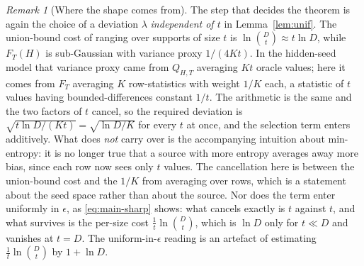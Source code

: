 \documentclass[11pt,a4paper]{article}
\theoremstyle{plain}
\theoremstyle{definition}
\theoremstyle{remark}
\newtheorem{remark}{Remark}
\begin{document}
\begin{remark}[Where the shape comes from]\label{rem:shape}
The step that decides the theorem is again the choice of a deviation $\lambda$ \emph{independent of
$t$} in Lemma~\ref{lem:unif}. The union-bound cost of ranging over supports of size $t$ is
$\ln\binom{D}{t} \approx t \ln D$, while $F_T(H)$ is sub-Gaussian with variance proxy $1/(4Kt)$.
In the hidden-seed model that variance proxy came from $Q_{H,T}$ averaging $Kt$ oracle values; here
it comes from $F_T$ averaging $K$ row-statistics with weight $1/K$ each, a statistic of $t$ values
having bounded-differences constant $1/t$. The arithmetic is the same and the two factors of $t$
cancel, so the required deviation is $\sqrt{t \ln D/(Kt)} = \sqrt{\ln D/K}$ for every $t$ at once,
and the selection term enters additively. What does \emph{not} carry over is the accompanying
intuition about min-entropy: it is no longer true that a source with more entropy averages away
more bias, since each row now sees only $t$ values. The cancellation here is between the
union-bound cost and the $1/K$ from averaging over rows, which is a statement about the seed space
rather than about the source. Nor does the term enter uniformly in $\epsilon$, as
\eqref{eq:main-sharp} shows: what cancels exactly is $t$ against $t$, and what survives is the
per-size cost $\tfrac1t\ln\binom Dt$, which is $\ln D$ only for $t \ll D$ and vanishes at $t = D$.
The uniform-in-$\epsilon$ reading is an artefact of estimating $\tfrac1t\ln\binom Dt$ by
$1 + \ln D$.
\end{remark}
\end{document}
